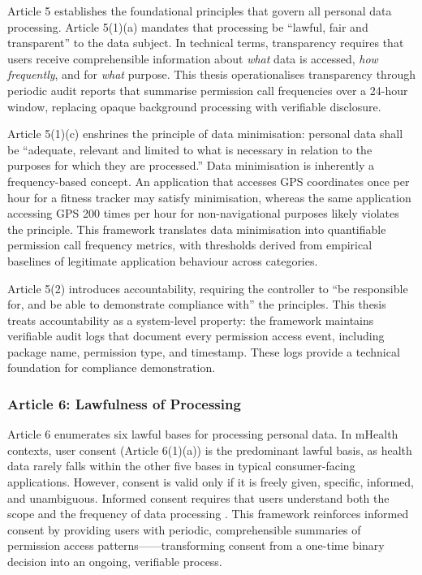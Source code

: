 Article 5 establishes the foundational principles that govern all personal data processing. Article 5(1)(a) mandates that processing be ``lawful, fair and transparent'' to the data subject. In technical terms, transparency requires that users receive comprehensible information about \emph{what} data is accessed, \emph{how frequently}, and for \emph{what} purpose. This thesis operationalises transparency through periodic audit reports that summarise permission call frequencies over a 24-hour window, replacing opaque background processing with verifiable disclosure.

Article 5(1)(c) enshrines the principle of data minimisation: personal data shall be ``adequate, relevant and limited to what is necessary in relation to the purposes for which they are processed.'' Data minimisation is inherently a frequency-based concept. An application that accesses GPS coordinates once per hour for a fitness tracker may satisfy minimisation, whereas the same application accessing GPS 200 times per hour for non-navigational purposes likely violates the principle. This framework translates data minimisation into quantifiable permission call frequency metrics, with thresholds derived from empirical baselines of legitimate application behaviour across categories.

Article 5(2) introduces accountability, requiring the controller to ``be responsible for, and be able to demonstrate compliance with'' the principles. This thesis treats accountability as a system-level property: the framework maintains verifiable audit logs that document every permission access event, including package name, permission type, and timestamp. These logs provide a technical foundation for compliance demonstration.

\subsubsection{Article 6: Lawfulness of Processing}

Article 6 enumerates six lawful bases for processing personal data. In mHealth contexts, user consent (Article 6(1)(a)) is the predominant lawful basis, as health data rarely falls within the other five bases in typical consumer-facing applications. However, consent is valid only if it is freely given, specific, informed, and unambiguous. Informed consent requires that users understand both the scope and the frequency of data processing \cite{14}. This framework reinforces informed consent by providing users with periodic, comprehensible summaries of permission access patterns——transforming consent from a one-time binary decision into an ongoing, verifiable process.

